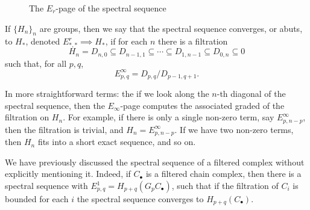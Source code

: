 \documentclass[ma3408.tex]{subfiles}
\begin{document}
\begin{Rem}
\begin{figure}[h!]
\caption{The $E_r$-page of the spectral sequence}
\end{figure}
\end{Rem}
\begin{Def}
	If $\{H_n\}_{n}$ are groups, then we say that the spectral sequence converges, or abuts, to $H_*$, denoted $E^r_{*,*} \implies H_*$, if for each $n$ there is a filtration
	\[
H_n = D_{n,0} \subseteq D_{n-1,1} \subseteq \cdots \subseteq D_{1,n-1} \subseteq D_{0,n} \subseteq 0
	\]
	such that, for all $p,q$, 
	\[
E^{\infty}_{p,q} = D_{p,q}/D_{p-1,q+1}.
	\]
\end{Def}
\begin{Rem}
In more straightforward terms: the if we look along the $n$-th diagonal of the spectral sequence, then the $E_{\infty}$-page computes the associated graded of the filtration on $H_n$. For example, if there is only a single non-zero term, say $E^{\infty}_{p,n-p}$, then the filtration is trivial, and $H_n = E^{\infty}_{p,n-p}$. If we have two non-zero terms, then $H_n$ fits into a short exact sequence, and so on. 
\end{Rem}
\begin{Exa}\label{ex:ss_filtered_complex}
We have previously discussed the spectral sequence of a filtered complex without explicitly mentioning it. Indeed, if $C_{\bullet}$ is a filtered chain complex, then there is a spectral sequence with $E^1_{p,q} = H_{p+q}(G_pC_{\bullet})$, such that if the filtration of $C_i$ is bounded for each $i$ the spectral sequence converges to $H_{p+q}(C_{\bullet})$.
\end{Exa}
\end{document}
